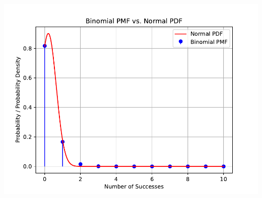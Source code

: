 \documentclass[journal,12pt,onecolumn]{IEEEtran}
\theoremstyle{remark}
\begin{document}
\begin{enumerate}[label=(\roman*)]
\includegraphics[width=\columnwidth]{./figs/plot.pdf}
\end{enumerate}
\end{document}
